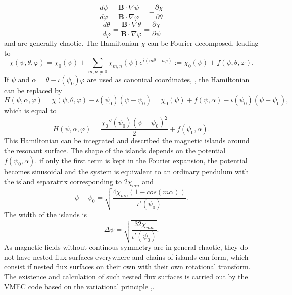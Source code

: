 \begin{equation}
    \frac{d\psi}{d\varphi} = \frac{\textbf{B} \cdot \nabla \psi}{\textbf{B} \cdot \nabla \varphi} = - \frac{\partial \chi}{\partial \theta}
\end{equation}
\begin{equation}
    \frac{d\theta}{d\varphi} = \frac{\textbf{B} \cdot \nabla \theta}{\textbf{B} \cdot \nabla \varphi} =  \frac{\partial \chi}{\partial \psi}
\end{equation}
and are generally chaotic. The Hamiltonian $\chi$ can be Fourier decomposed, leading to
\begin{equation}
    \chi (\psi, \theta, \varphi) = \chi_0 (\psi) + \sum_{m, n\neq 0} \chi_{m,n}(\psi)e^{i(m\theta-n\varphi)} := \chi_0 (\psi) + f(\psi, \theta, \varphi).
\end{equation}
If $\psi$ and $\alpha = \theta-\iota(\psi_0)\varphi$ are used as canonical coordinates, , the Hamiltonian can be replaced by
\begin{equation}
    H(\psi, \alpha, \varphi) = \chi(\psi, \theta, \varphi)-\iota(\psi_0)(\psi-\psi_0) = \chi_0(\psi) + f(\psi, \alpha) - \iota(\psi_0)(\psi-\psi_0),
\end{equation}
which is equal to
\begin{equation}
    H(\psi, \alpha, \varphi) = \frac{\chi_0''(\psi_0)(\psi- \psi_0)^2}{2}+f(\psi_0, \alpha).
\end{equation}
This Hamiltonian can be integrated and described the magnetic islands around the resonant surface. The shape of the islands depends on the potential $f(\psi_0, \alpha)$. if only the first term is kept in the Fourier expansion, the potential becomes sinusoidal and the system is equivalent to an ordinary pendulum with the island separatrix corresponding to $2\chi_{mn}$ and
\begin{equation}
    \psi-\psi_0 = \sqrt{\frac{4\chi_{mn}(1-cos(m\alpha))}{\iota'(\psi_0)}}.
\end{equation}
The width of the islands is
\begin{equation}
    \Delta \psi = \sqrt{\frac{32\chi_{mn}}{\iota'(\psi_0)}}.
\end{equation}
As magnetic fields without continous symmetry are in general chaotic, they do not have nested flux surfaces everywhere and chains of islands can form, which consist if nested flux surfaces on their own with their own rotational transform. \\
The existence and calculation of such nested flux surfaces is carried out by the VMEC code based on the variational principle \cite{Hirshman1983},\cite{Hirshman1986}.

